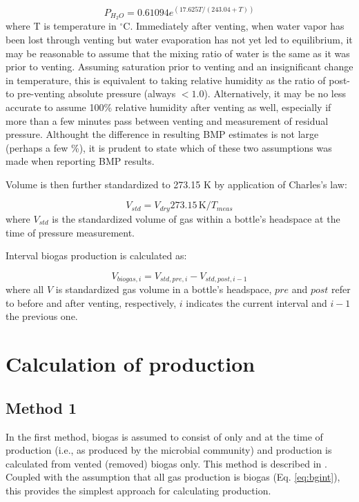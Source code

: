 \documentclass[]{article}
\newcommand{\unit}[1]{\ensuremath{\, \mathrm{#1}}}
\begin{document}
\begin{equation}
\label{eq:magnus}
   P_{H_2O} = 0.61094 e^{(17.625 T/(243.04 + T))}
\end{equation}
where T is temperature in $^\circ$C.
Immediately after venting, when water vapor has been lost through venting but water evaporation has not yet led to equilibrium, it may be reasonable to assume that the mixing ratio of water is the same as it was prior to venting.
Assuming saturation prior to venting and an insignificant change in temperature, this is equivalent to taking relative humidity as the ratio of post- to pre-venting absolute pressure (always $<1.0$). 
Alternatively, it may be no less accurate to assume 100\% relative humidity after venting as well, especially if more than a few minutes pass between venting and measurement of residual pressure.
Althought the difference in resulting BMP estimates is not large (perhaps a few \%), it is prudent to state which of these two assumptions was made when reporting BMP results.

Volume is then further standardized to 273.15 K by application of Charles's law:

\begin{equation}
  \label{eq:bgstd}
  V_{std} = V_{dry} 273.15 \unit{K}/T_{meas}
\end{equation}
where $V_{std}$ is the standardized volume of gas within a bottle's headspace at the time of pressure measurement.

Interval biogas production is calculated as:

\begin{equation}
  \label{eq:bgint}
  V_{biogas, i} = V_{std, pre, i} - V_{std, post, i - 1}
\end{equation}
where all $V$ is standardized gas volume in a bottle's headspace, $pre$ and $post$ refer to before and after venting, respectively, $i$ indicates the current interval and $i-1$ the previous one.

\section{Calculation of  production}
\subsection{Method 1}
In the first method, biogas is assumed to consist of only  and  at the time of production (i.e., as produced by the microbial community) and  production is calculated from vented (removed) biogas only.
This method is described in \cite{brian1991}.
Coupled with the assumption that all gas production is biogas (Eq. \ref{eq:bgint}), this provides the simplest approach for calculating  production.
\end{document}

